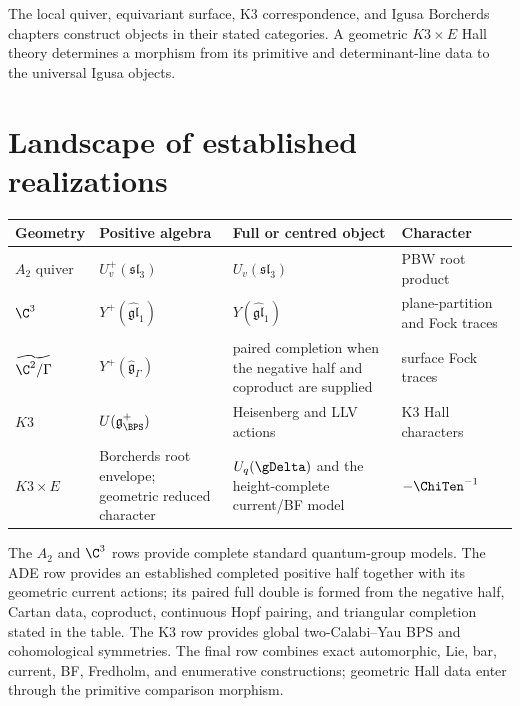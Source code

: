 The local quiver, equivariant surface, K3 correspondence, and Igusa Borcherds chapters construct objects in their stated categories.  A geometric $K3\times E$ Hall theory determines a morphism from its primitive and determinant-line data to the universal Igusa objects.

\chapter{Landscape of established realizations}
\begin{center}
\footnotesize
\begin{tabularx}{0.99\textwidth}{@{}>{\raggedright\arraybackslash}p{}>{\raggedright\arraybackslash}p{}>{\raggedright\arraybackslash}X>{\raggedright\arraybackslash}p{}@{}}
\toprule
\textbf{Geometry}&\textbf{Positive algebra}&\textbf{Full or centred object}&\textbf{Character}\\
\midrule
$A_2$ quiver&$U_v^+(\mathfrak{sl}_3)$&$U_v(\mathfrak{sl}_3)$&PBW root product\\
$\C^3$&$Y^+(\widehat{\mathfrak{gl}}_1)$&$Y(\widehat{\mathfrak{gl}}_1)$&plane-partition and Fock traces\\
$\widetilde{\C^2/\Gamma}$&$Y^+(\widehat{\mathfrak g}_\Gamma)$&paired completion when the negative half and coproduct are supplied&surface Fock traces\\
$K3$&$U(\mathfrak g_{\BPS}^+)$&Heisenberg and LLV actions&K3 Hall characters\\
$K3\times E$&Borcherds root envelope; geometric reduced character&$U_q(\gDelta)$ and the height-complete current/BF model&$-\ChiTen^{-1}$\\
\bottomrule
\end{tabularx}
\end{center}
The $A_2$ and $\C^3$ rows provide complete standard quantum-group models. The ADE row provides an established completed positive half together with its geometric current actions; its paired full double is formed from the negative half, Cartan data, coproduct, continuous Hopf pairing, and triangular completion stated in the table. The K3 row provides global two-Calabi--Yau BPS and cohomological symmetries. The final row combines exact automorphic, Lie, bar, current, BF, Fredholm, and enumerative constructions; geometric Hall data enter through the primitive comparison morphism.

